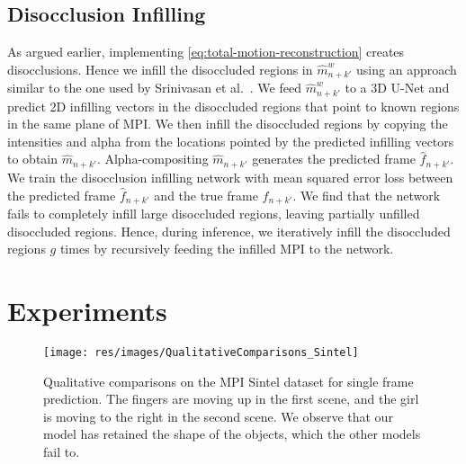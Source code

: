 \documentclass[preprint]{vgtc}
\def\etal{et al.}
\begin{document}
    \subsection{Disocclusion Infilling}\label{subsec:infilling}
    As argued earlier, implementing \autoref{eq:total-motion-reconstruction} creates disocclusions.
    Hence we infill the disoccluded regions in $\hat{m}^w_{n+k'}$ using an approach similar to the one used by Srinivasan \etal~\cite{srinivasan2019pushing}.
    We feed $\hat{m}^w_{n+k'}$ to a 3D U-Net and predict 2D infilling vectors in the disoccluded regions that point to known regions in the same plane of MPI\@.
    We then infill the disoccluded regions by copying the intensities and alpha from the locations pointed by the predicted infilling vectors to obtain $\hat{m}_{n+k'}$.
    Alpha-compositing $\hat{m}_{n+k'}$ generates the predicted frame $\hat{f}_{n+k'}$.
    We train the disocclusion infilling network with mean squared error loss between the predicted frame $\hat{f}_{n+k'}$ and the true frame $f_{n+k'}$.
    We find that the network fails to completely infill large disoccluded regions, leaving partially unfilled disoccluded regions.
    Hence, during inference, we iteratively infill the disoccluded regions $g$ times by recursively feeding the infilled MPI to the network.


    \section{Experiments}\label{sec:experiments}

    \begin{figure*}
        \centering
        \texttt{[image: res/images/QualitativeComparisons\_Sintel]}
        \caption{Qualitative comparisons on the MPI Sintel dataset for single frame prediction.
        The fingers are moving up in the first scene, and the girl is moving to the right in the second scene.
        We observe that our model has retained the shape of the objects, which the other models fail to.
}
        \label{fig:qualitative-comparisons-sintel}
    \end{figure*}
\end{document}
